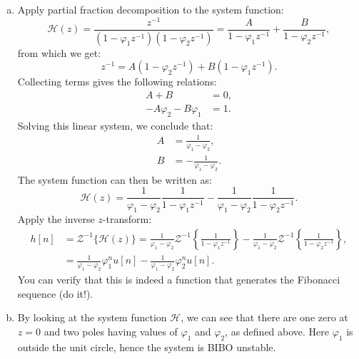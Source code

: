 \begin{enumerate}
\begin{enumerate}[a)]
              \item Apply partial fraction decomposition to the system function:
                    \[\mathcal{H}(z)=\frac{z^{-1}}{(1-\varphi_{1}z^{-1})(1-\varphi_{2}z^{-1})}=\frac{A}{1-\varphi_{1}z^{-1}}+\frac{B}{1-\varphi_{2}z^{-1}},\]
                    from which we get:
                    \[z^{-1}=A(1-\varphi_{2}z^{-1})+B(1-\varphi_{1}z^{-1}).\]
                    Collecting terms gives the following relations:
                    \begin{align*}
                        A + B                      & = 0, \\
                        -A\varphi_{2}-B\varphi_{1} & = 1.
                    \end{align*}
                    Solving this linear system, we conclude that:
                    \begin{align*}
                        A & = \frac{1}{\varphi_{1}-\varphi_{2}},  \\
                        B & = -\frac{1}{\varphi_{1}-\varphi_{2}}.
                    \end{align*}
                    The system function can then be written as:
                    \[\mathcal{H}(z)=\frac{1}{\varphi_{1}-\varphi_{2}}\frac{1}{1-\varphi_{1}z^{-1}}-\frac{1}{\varphi_{1}-\varphi_{2}}\frac{1}{1-\varphi_{2}z^{-1}}.\]
                    Apply the inverse $z$-transform:
                    \begin{align*}
                        h[n] & =\mathcal{Z}^{-1}\{\mathcal{H}(z)\}=\frac{1}{\varphi_{1}-\varphi_{2}}\mathcal{Z}^{-1}\left\{\frac{1}{1-\varphi_{1}z^{-1}}\right\}-\frac{1}{\varphi_{1}-\varphi_{2}}\mathcal{Z}^{-1}\left\{\frac{1}{1-\varphi_{2}z^{-1}}\right\}, \\
                             & =\frac{1}{\varphi_{1}-\varphi_{2}}\varphi_{1}^{n}u[n] - \frac{1}{\varphi_{1}-\varphi_{2}}\varphi_{2}^{n}u[n].
                    \end{align*}
                    You can verify that this is indeed a function that generates the Fibonacci sequence (do it!).

              \item By looking at the system function $\mathcal{H}$, we can see that there are one zero at $z = 0$ and two poles
                    having values of $\varphi_{1}$ and $\varphi_{2}$, as defined above. Here $\varphi_{1}$ is outside the unit circle, hence
                    the system is BIBO unstable.


\end{enumerate}
\end{enumerate}

